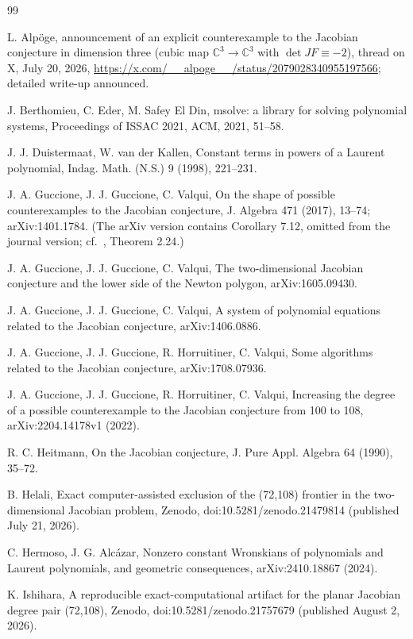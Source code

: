 \documentclass[11pt]{article}
\theoremstyle{definition}
\theoremstyle{remark}
\begin{document}
\small
\begin{thebibliography}{99}

 L. Alp\"oge, announcement of an explicit counterexample to the Jacobian conjecture in dimension three (cubic map $\mathbb{C}^3\to\mathbb{C}^3$ with $\det JF\equiv-2$), thread on X, July 20, 2026, \url{https://x.com/__alpoge__/status/2079028340955197566}; detailed write-up announced.

 J. Berthomieu, C. Eder, M. Safey El Din, msolve: a library for solving polynomial systems, Proceedings of ISSAC 2021, ACM, 2021, 51--58.

 J. J. Duistermaat, W. van der Kallen, Constant terms in powers of a Laurent polynomial, Indag. Math. (N.S.) 9 (1998), 221--231.

 J. A. Guccione, J. J. Guccione, C. Valqui, On the shape of possible counterexamples to the Jacobian conjecture, J. Algebra 471 (2017), 13--74; arXiv:1401.1784. (The arXiv version contains Corollary 7.12, omitted from the journal version; cf.\ \cite{Heitmann}, Theorem 2.24.)

 J. A. Guccione, J. J. Guccione, C. Valqui, The two-dimensional Jacobian conjecture and the lower side of the Newton polygon, arXiv:1605.09430.

 J. A. Guccione, J. J. Guccione, C. Valqui, A system of polynomial equations related to the Jacobian conjecture, arXiv:1406.0886.

 J. A. Guccione, J. J. Guccione, R. Horruitiner, C. Valqui, Some algorithms related to the Jacobian conjecture, arXiv:1708.07936.

 J. A. Guccione, J. J. Guccione, R. Horruitiner, C. Valqui, Increasing the degree of a possible counterexample to the Jacobian conjecture from 100 to 108, arXiv:2204.14178v1 (2022).

 R. C. Heitmann, On the Jacobian conjecture, J. Pure Appl. Algebra 64 (1990), 35--72.

 B. Helali, Exact computer-assisted exclusion of the (72,108) frontier in the two-dimensional Jacobian problem, Zenodo, doi:10.5281/zenodo.21479814 (published July 21, 2026).

 C. Hermoso, J. G. Alc\'azar, Nonzero constant Wronskians of polynomials and Laurent polynomials, and geometric consequences, arXiv:2410.18867 (2024).

 K. Ishihara, A reproducible exact-computational artifact for the planar Jacobian degree pair (72,108), Zenodo, doi:10.5281/zenodo.21757679 (published August 2, 2026).


\end{thebibliography}
\end{document}
